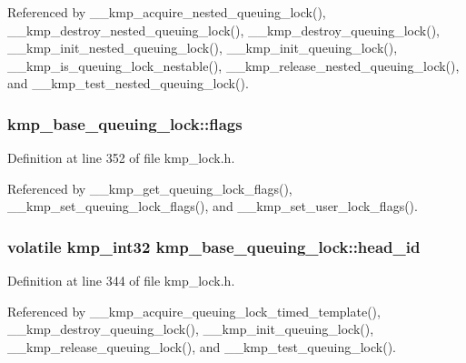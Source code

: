 Referenced by \-\_\-\-\_\-kmp\-\_\-acquire\-\_\-nested\-\_\-queuing\-\_\-lock(), \-\_\-\-\_\-kmp\-\_\-destroy\-\_\-nested\-\_\-queuing\-\_\-lock(), \-\_\-\-\_\-kmp\-\_\-destroy\-\_\-queuing\-\_\-lock(), \-\_\-\-\_\-kmp\-\_\-init\-\_\-nested\-\_\-queuing\-\_\-lock(), \-\_\-\-\_\-kmp\-\_\-init\-\_\-queuing\-\_\-lock(), \-\_\-\-\_\-kmp\-\_\-is\-\_\-queuing\-\_\-lock\-\_\-nestable(), \-\_\-\-\_\-kmp\-\_\-release\-\_\-nested\-\_\-queuing\-\_\-lock(), and \-\_\-\-\_\-kmp\-\_\-test\-\_\-nested\-\_\-queuing\-\_\-lock().

\hypertarget{structkmp__base__queuing__lock_a7a852c13f6838e44d2ef503d98420f2c}{
\subsubsection[{flags}]{ kmp\-\_\-base\-\_\-queuing\-\_\-lock\-::flags}}\label{structkmp__base__queuing__lock_a7a852c13f6838e44d2ef503d98420f2c}


Definition at line 352 of file kmp\-\_\-lock.\-h.



Referenced by \-\_\-\-\_\-kmp\-\_\-get\-\_\-queuing\-\_\-lock\-\_\-flags(), \-\_\-\-\_\-kmp\-\_\-set\-\_\-queuing\-\_\-lock\-\_\-flags(), and \-\_\-\-\_\-kmp\-\_\-set\-\_\-user\-\_\-lock\-\_\-flags().

\hypertarget{structkmp__base__queuing__lock_a7394dd8dc4fcc01f0ca8acda1a2ac82a}{
\subsubsection[{head\-\_\-id}]{\setlength{\rightskip}{0pt plus 5cm}volatile kmp\-\_\-int32 kmp\-\_\-base\-\_\-queuing\-\_\-lock\-::head\-\_\-id}}\label{structkmp__base__queuing__lock_a7394dd8dc4fcc01f0ca8acda1a2ac82a}


Definition at line 344 of file kmp\-\_\-lock.\-h.



Referenced by \-\_\-\-\_\-kmp\-\_\-acquire\-\_\-queuing\-\_\-lock\-\_\-timed\-\_\-template(), \-\_\-\-\_\-kmp\-\_\-destroy\-\_\-queuing\-\_\-lock(), \-\_\-\-\_\-kmp\-\_\-init\-\_\-queuing\-\_\-lock(), \-\_\-\-\_\-kmp\-\_\-release\-\_\-queuing\-\_\-lock(), and \-\_\-\-\_\-kmp\-\_\-test\-\_\-queuing\-\_\-lock().

